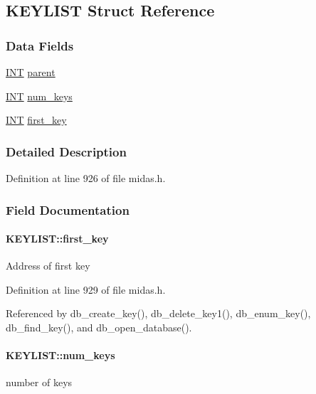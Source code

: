 \subsection{KEYLIST Struct Reference}
\label{structKEYLIST}
\subsubsection*{Data Fields}
\begin{DoxyCompactItemize}
\item 
\hyperlink{vppg_8h_a392e62da233ed3e2f7c3fd4f487a3896}{INT} \hyperlink{structKEYLIST_a9ee7404861b4dbcc3e79177ab1747678}{parent}
\item 
\hyperlink{vppg_8h_a392e62da233ed3e2f7c3fd4f487a3896}{INT} \hyperlink{structKEYLIST_a391c028d9dd1136953732abb4ea2e7b3}{num\_\-keys}
\item 
\hyperlink{vppg_8h_a392e62da233ed3e2f7c3fd4f487a3896}{INT} \hyperlink{structKEYLIST_aad8212fa30f1a2c779f4e05a06e2860b}{first\_\-key}
\end{DoxyCompactItemize}


\subsubsection{Detailed Description}


Definition at line 926 of file midas.h.

\subsubsection{Field Documentation}
\paragraph[{first\_\-key}]{ {\bf KEYLIST::first\_\-key}}\hfill\label{structKEYLIST_aad8212fa30f1a2c779f4e05a06e2860b}
Address of first key 

Definition at line 929 of file midas.h.

Referenced by db\_\-create\_\-key(), db\_\-delete\_\-key1(), db\_\-enum\_\-key(), db\_\-find\_\-key(), and db\_\-open\_\-database().
\paragraph[{num\_\-keys}]{ {\bf KEYLIST::num\_\-keys}}\hfill\label{structKEYLIST_a391c028d9dd1136953732abb4ea2e7b3}
number of keys 

